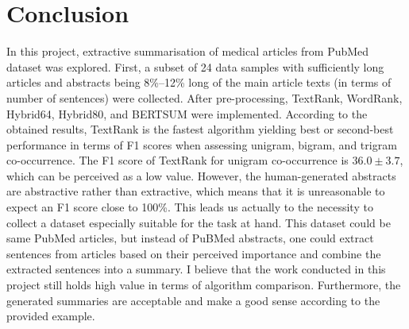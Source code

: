 \documentclass[11pt]{article}
\begin{document}
\section{Conclusion}

In this project, extractive summarisation of medical articles from PubMed dataset was explored. First, a subset of 24 data samples with sufficiently long articles and abstracts being 8\%--12\% long of the main article texts (in terms of number of sentences) were collected. After pre-processing, TextRank, WordRank, Hybrid64, Hybrid80, and BERTSUM were implemented. According to the obtained results, TextRank is the fastest algorithm yielding best or second-best performance in terms of F1 scores when assessing unigram, bigram, and trigram co-occurrence. The F1 score of TextRank for unigram co-occurrence is $36.0 \pm 3.7$, which can be perceived as a low value. However, the human-generated abstracts are abstractive rather than extractive, which means that it is unreasonable to expect an F1 score close to 100\%. This leads us actually to the necessity to collect a dataset especially suitable for the task at hand. This dataset could be same PubMed articles, but instead of PuBMed abstracts, one could extract sentences from articles based on their perceived importance and combine the extracted sentences into a summary. I believe that the work conducted in this project still holds high value in terms of algorithm comparison. Furthermore, the generated summaries are acceptable and make a good sense according to the provided example.




\end{document}
